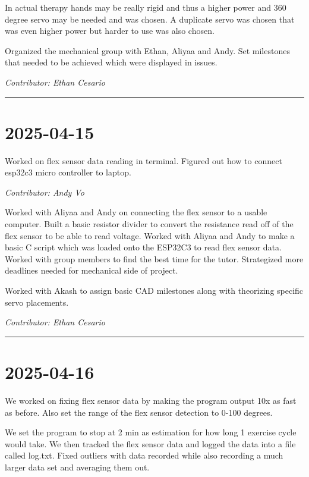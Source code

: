 \documentclass[12pt]{article}
\begin{document}
In actual therapy hands may be really rigid and thus a higher power and 360 degree servo may be needed and was chosen. A duplicate servo was chosen that was even higher power but harder to use was also chosen.

Organized the mechanical group with Ethan, Aliyaa and Andy. Set milestones that needed to be achieved which were displayed in issues. 

\vspace{1em}
\noindent\textit{Contributor: Ethan Cesario}
\vspace{1em}
\hrule


\section*{2025-04-15}
Worked on flex sensor data reading in terminal. Figured out how to connect esp32c3 micro controller to laptop.


\vspace{1em}
\noindent\textit{Contributor: Andy Vo}
\vspace{1em}

Worked with Aliyaa and Andy on connecting the flex sensor to a usable computer. Built a basic resistor divider to convert the resistance read off of the flex sensor to be able to read voltage. Worked with Aliyaa and Andy to make a basic C script which was loaded onto the ESP32C3 to read flex sensor data. Worked with group members to find the best time for the tutor. Strategized more deadlines needed for mechanical side of project.

Worked with Akash to assign basic CAD milestones along with theorizing specific servo placements.

\vspace{1em}
\noindent\textit{Contributor: Ethan Cesario}
\vspace{1em}

\hrule

\section*{2025-04-16}
We worked on fixing flex sensor data by making the program output 10x as fast as before. Also set the range of the flex sensor detection to 0-100 degrees. 

We set the program to stop at 2 min as estimation for how long 1 exercise cycle would take. We then tracked the flex sensor data and logged the data into a file called log.txt. Fixed outliers with data recorded while also recording a much larger data set and averaging them out.
\end{document}
